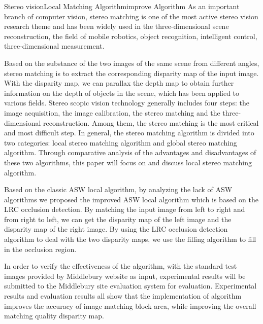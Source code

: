 
\begin{Eabstract}{Stereo vision}{Local Matching Algorithm}{improve Algorithm}{}{}
As  an  important  branch  of  computer  vision,  stereo  matching  is  one  of  the  most 
active stereo vision research theme and has been widely used in the three-dimensional 
scene reconstruction, the field of mobile robotics, object recognition, intelligent control, 
three-dimensional measurement. 

Based on the substance of the two images of the same scene from different angles, 
stereo matching is to extract the corresponding disparity map of the input image. With 
the disparity map, we can parallax the depth map to obtain further information on the 
depth  of  objects  in  the  scene,  which  has  been  applied  to  various  fields.  Stereo  scopic 
vision  technology  generally  includes  four  steps:  the  image  acquisition,  the  image 
calibration, the stereo matching and the three-dimensional reconstruction. Among them, 
the  stereo  matching  is  the  most  critical  and  most  difficult  step.  In  general,  the  stereo 
matching algorithm is divided into two categories: local stereo matching algorithm and 
global stereo matching algorithm. Through comparative analysis of the advantages and 
disadvantages of these two algorithms, this paper will focus on and discuss local stereo 
matching algorithm. 

Based  on  the  classic  ASW  local  algorithm,  by  analyzing  the  lack  of  ASW 
algorithms we proposed the improved ASW local algorithm which is based on the LRC 
occlusion  detection.  By  matching  the  input  image  from  left  to  right  and  from  right  to 
left, we  can  get the disparity map of the left image and the disparity map of the right 
image. By using the LRC occlusion detection algorithm to  deal with the two disparity 
maps, we use the filling algorithm to fill in the occlusion region. 

In order to verify the effectiveness of the algorithm, with the standard test images 
provided by Middlebury website as input, experimental results will be submitted to the 
Middlebury  site evaluation system for evaluation. Experimental results  and evaluation 
results all show that the implementation of algorithm improves the 
accuracy of image matching block  area, while improving the overall matching quality 
disparity map. 
\end{Eabstract}
